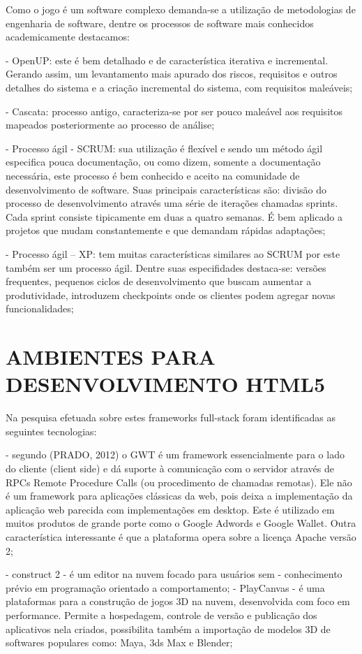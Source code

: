 \documentclass[
12pt,
a4paper,
portuges,
draft
]{report}
\begin{document}
Como o jogo é um software complexo demanda-se a utilização de
metodologias de engenharia de software, dentre os processos de software
mais conhecidos academicamente destacamos:

- OpenUP: este é bem detalhado e de característica iterativa e
incremental. Gerando assim, um levantamento mais apurado dos riscos,
requisitos e outros detalhes do sistema e a criação incremental do
sistema, com requisitos maleáveis;

- Cascata: processo antigo, caracteriza-se por ser pouco maleável aos
requisitos mapeados posteriormente ao processo de análise;

- Processo ágil - SCRUM: sua utilização é flexível e sendo
um método ágil especifica pouca documentação, ou como dizem,
somente a documentação necessária, este processo é bem conhecido e
aceito na comunidade de desenvolvimento de software. Suas principais
características são: divisão do processo de desenvolvimento através
uma série de iterações chamadas sprints. Cada sprint consiste
tipicamente em duas a quatro semanas. É bem aplicado a projetos que
mudam constantemente e que demandam rápidas adaptações;

- Processo ágil – XP: tem muitas características similares ao SCRUM
por este também ser um processo ágil. Dentre suas especifidades
destaca-se: versões frequentes, pequenos ciclos de desenvolvimento que
buscam aumentar a produtividade, introduzem checkpoints onde os clientes
podem agregar novas funcionalidades;

\chapter{AMBIENTES PARA DESENVOLVIMENTO HTML5}

Na pesquisa efetuada sobre estes frameworks full-stack foram
identificadas as seguintes tecnologias:

    - segundo (PRADO, 2012) o GWT é um framework essencialmente para
o lado do cliente (client side) e dá suporte à comunicação com
o servidor através de RPCs Remote Procedure Calls (ou procedimento
de chamadas remotas). Ele não é um framework para aplicações
clássicas da web, pois deixa a implementação da aplicação web
parecida com implementações em desktop. Este é utilizado em muitos
produtos de grande porte como o Google Adwords e Google Wallet. Outra
característica interessante é que a plataforma opera sobre a licença
Apache versão 2;

    - construct 2 - é um editor na nuvem focado para usuários sem
    - conhecimento prévio em programação orientado a comportamento;
    - PlayCanvas - é uma plataformas para a construção de jogos 3D
na nuvem, desenvolvida com foco em performance. Permite a hospedagem,
controle de versão e publicação dos aplicativos nela criados,
possibilita também a importação de modelos 3D de softwares populares
como: Maya, 3ds Max e Blender;
\end{document}

